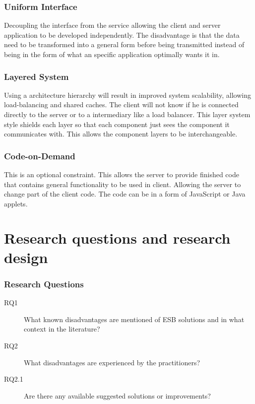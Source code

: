 \documentclass{llncs}
\begin{document}
\subsubsection{Uniform Interface}
Decoupling the interface from the service allowing the client and server application to be developed  independently. The disadvantage is that the data need to be transformed into a general form before being transmitted instead of being in the form of what an specific application optimally wants it in.

\subsubsection{Layered System}
Using a architecture hierarchy will result in improved system scalability, allowing load-balancing and shared caches. The client will not know if he is connected directly to the server or to a intermediary like a load balancer. This layer system style shields each layer so that each component just sees the component it communicates with. This allows the component layers to be interchangeable.

\subsubsection{Code-on-Demand}
This is an optional constraint. This allows the server to provide finished code that contains general functionality to be used in client. Allowing the server to change part of the client code. The code can be in a form of JavaScript or Java applets.


\section{Research questions and research design}
\subsubsection{Research Questions}

\begin{description}
\item[RQ1] What known disadvantages are mentioned of ESB solutions and in what context in the literature?
\item[RQ2] What disadvantages are experienced by the practitioners?
\item[RQ2.1] Are there any available suggested solutions or improvements?
\end{description}
\end{document}
